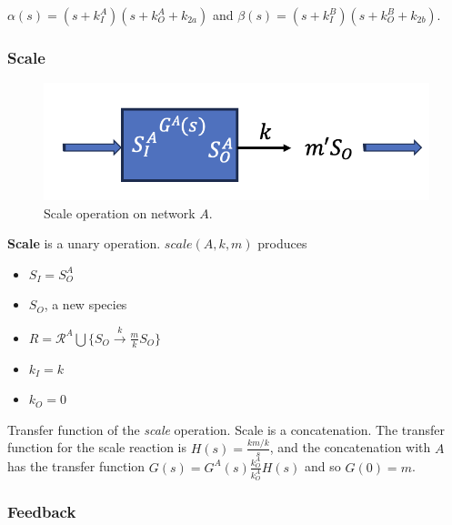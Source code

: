 \documentclass[unnumsec,webpdf,contemporary,large]{oup-authoring-template}%
\theoremstyle{thmstyleone}%
\theoremstyle{thmstyletwo}%
\theoremstyle{thmstylethree}%
\begin{document}
$\alpha(s) = (s + k^A_I) (s + k^A_O + k_{2a})$ and
$\beta(s) = (s + k^B_I) (s + k^B_O + k_{2b})$.

\subsubsection{Scale}
\begin{figure}
         \centering
         \includegraphics[scale=0.4]{figures/scale.png}
          \caption[]{Scale operation on network $A$.}
         \label{fig:scale}
\end{figure}
{\bf Scale} is a unary operation.
$scale(A, k, m)$ produces 
\begin{itemize}
\item $S_I = S^A_O$
\item $S_O$, a new species
\item $R = \mathcal{R}^A \bigcup \{S_O \xrightarrow{k} \frac{m}{k} S_O\}$
\item $k_I = k$
\item $k_O = 0$
\end{itemize}

Transfer function of the {\em scale} operation.
Scale is a concatenation.
The transfer function for the scale reaction is
$H(s) = \frac{km/k } {s}$, and the concatenation with $A$
has the transfer function
$G(s) = G^A(s) \frac{k^A_O}{k^A_O} H(s)$ and so
$G(0) = m$.


\subsubsection{Feedback}
\end{document}
